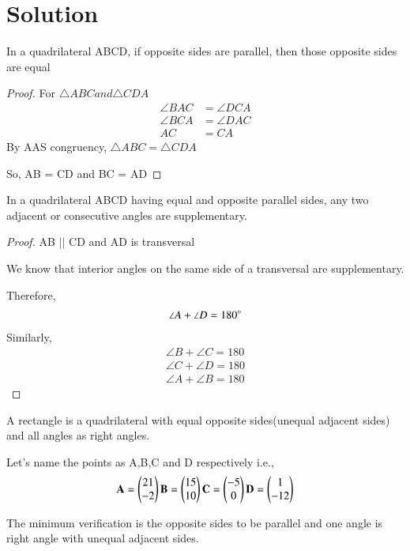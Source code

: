 \documentclass[journal,12pt,twocolumn]{IEEEtran}
\begin{document}
\section{Solution}
\begin{lemma}
In a quadrilateral ABCD, if opposite sides are parallel, then those opposite sides are equal
\end{lemma}
\begin{proof}
For $\triangle ABC and \triangle CDA$
\begin{align}
    \angle{BAC} &= \angle{DCA}\\
    \angle{BCA} &= \angle{DAC}\\
    AC &= CA
\end{align}
By AAS congruency, $\triangle ABC = \triangle CDA$

So, AB = CD and BC = AD
\end{proof}
\begin{lemma}
In a quadrilateral ABCD having equal and opposite parallel sides, any two adjacent or consecutive angles are supplementary.
 \label{lemma 2}
\end{lemma} 
\begin{proof}
AB $||$ CD and AD is transversal

We know that interior angles on the same side of a transversal are supplementary.

Therefore,
\begin{align}
    \angle A + \angle D = 180\degree
\end{align}
Similarly,
\begin{align}
    \angle B + \angle C = 180\\
    \angle C + \angle D = 180\\
    \angle A + \angle B = 180
\end{align}
\end{proof}
A rectangle is a quadrilateral with equal opposite sides(unequal adjacent sides) and all angles as right angles.

Let's name the points as A,B,C and D respectively i.e.,
\begin{align}
\mathbf{A} = \begin{pmatrix}21\\-2\end{pmatrix}
\mathbf{B} = \begin{pmatrix}15\\10\end{pmatrix}
\mathbf{C} = \begin{pmatrix}-5\\0\end{pmatrix}
\mathbf{D} = \begin{pmatrix}1\\-12\end{pmatrix}\label{eq 2.0.1}
\end{align}

The minimum verification is the opposite sides to be parallel and one angle is right angle with unequal adjacent sides.
\end{document}
